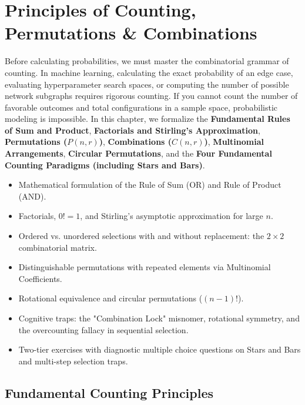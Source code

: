 \chapter{Principles of Counting, Permutations \& Combinations}

Before calculating probabilities, we must master the combinatorial grammar of counting. In machine learning, calculating the exact probability of an edge case, evaluating hyperparameter search spaces, or computing the number of possible network subgraphs requires rigorous counting. If you cannot count the number of favorable outcomes and total configurations in a sample space, probabilistic modeling is impossible. In this chapter, we formalize the \textbf{Fundamental Rules of Sum and Product}, \textbf{Factorials and Stirling's Approximation}, \textbf{Permutations ($P(n, r)$)}, \textbf{Combinations ($C(n, r)$)}, \textbf{Multinomial Arrangements}, \textbf{Circular Permutations}, and the \textbf{Four Fundamental Counting Paradigms (including Stars and Bars)}.

\vspace{0.5cm}
\begin{tcolorbox}[colback=primarylight, colframe=primarydark, title={\textbf{What You'll Learn in this Chapter}}]
\begin{itemize}
    \item Mathematical formulation of the Rule of Sum (OR) and Rule of Product (AND).
    \item Factorials, $0! = 1$, and Stirling's asymptotic approximation for large $n$.
    \item Ordered vs. unordered selections with and without replacement: the $2 \times 2$ combinatorial matrix.
    \item Distinguishable permutations with repeated elements via Multinomial Coefficients.
    \item Rotational equivalence and circular permutations ($(n-1)!$).
    \item Cognitive traps: the "Combination Lock" misnomer, rotational symmetry, and the overcounting fallacy in sequential selection.
    \item Two-tier exercises with diagnostic multiple choice questions on Stars and Bars and multi-step selection traps.
\end{itemize}
\end{tcolorbox}

\section{Fundamental Counting Principles}

